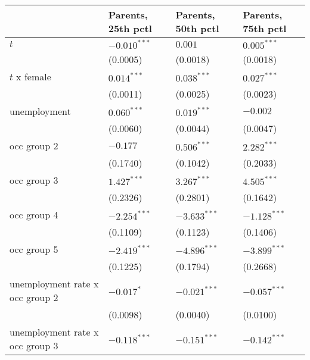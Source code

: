 \begin{tabular}{llll}
\toprule
{} & Parents, 25th pctl & Parents, 50th pctl & Parents, 75th pctl \\
\midrule
$t$                                      &     $-0.010^{***}$ &            $0.001$ &      $0.005^{***}$ \\
                                         &           (0.0005) &           (0.0018) &           (0.0018) \\
$t$ x female                             &      $0.014^{***}$ &      $0.038^{***}$ &      $0.027^{***}$ \\
                                         &           (0.0011) &           (0.0025) &           (0.0023) \\
unemployment                             &      $0.060^{***}$ &      $0.019^{***}$ &           $-0.002$ \\
                                         &           (0.0060) &           (0.0044) &           (0.0047) \\
occ group 2                              &           $-0.177$ &      $0.506^{***}$ &      $2.282^{***}$ \\
                                         &           (0.1740) &           (0.1042) &           (0.2033) \\
occ group 3                              &      $1.427^{***}$ &      $3.267^{***}$ &      $4.505^{***}$ \\
                                         &           (0.2326) &           (0.2801) &           (0.1642) \\
occ group 4                              &     $-2.254^{***}$ &     $-3.633^{***}$ &     $-1.128^{***}$ \\
                                         &           (0.1109) &           (0.1123) &           (0.1406) \\
occ group 5                              &     $-2.419^{***}$ &     $-4.896^{***}$ &     $-3.899^{***}$ \\
                                         &           (0.1225) &           (0.1794) &           (0.2668) \\
unemployment rate x occ group 2          &         $-0.017^*$ &     $-0.021^{***}$ &     $-0.057^{***}$ \\
                                         &           (0.0098) &           (0.0040) &           (0.0100) \\
unemployment rate x occ group 3          &     $-0.118^{***}$ &     $-0.151^{***}$ &     $-0.142^{***}$ \\

\end{tabular}
